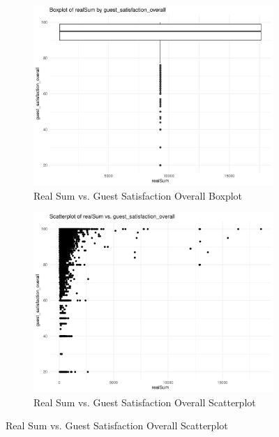 \documentclass[12pt, letterpaper]{article}
\begin{document}
\begin{figure}[H]
  \begin{subfigure}{0.45\textwidth}
    \includegraphics[width=\linewidth]{realSum_guest_satisfaction_overall__boxplot.pdf}
    \caption{Real Sum vs. Guest Satisfaction Overall Boxplot}
    \label{fig:realSum_guest_satisfaction_overall__boxplot}
  \end{subfigure}
  \hspace{0.05\textwidth}
  \begin{subfigure}{0.45\textwidth}
    \includegraphics[width=\linewidth]{realSum_guest_satisfaction_overall__scatterplot.pdf}
    \caption{Real Sum vs. Guest Satisfaction Overall Scatterplot}
    \label{fig:realSum_guest_satisfaction_overall__scatterplot}
  \end{subfigure}


\end{figure}
\end{document}
